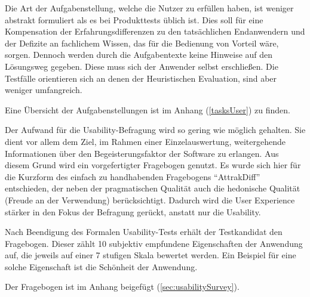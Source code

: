 Die Art der Aufgabenstellung, welche die Nutzer zu erfüllen haben, ist weniger abstrakt formuliert als es bei Produkttests üblich ist. Dies soll für eine Kompensation der Erfahrungsdifferenzen zu den tatsächlichen Endanwendern und der Defizite an fachlichem Wissen, das für die Bedienung von Vorteil wäre, sorgen. Dennoch werden durch die Aufgabentexte keine Hinweise auf den Lösungsweg gegeben. Diese muss sich der Anwender selbst erschließen. Die Testfälle orientieren sich an denen der Heuristischen Evaluation, sind aber weniger umfangreich.\par
Eine Übersicht der Aufgabenstellungen ist im Anhang (\ref{tasksUser}) zu finden.\par
{}
Der Aufwand für die Usability-Befragung wird so gering wie möglich gehalten. Sie dient vor allem dem Ziel, im Rahmen einer Einzelauswertung, weitergehende Informationen über den Begeisterungsfaktor der Software zu erlangen. Aus diesem Grund wird ein vorgefertigter Fragebogen genutzt. Es wurde sich hier für die Kurzform des einfach zu handhabenden Fragebogens \enquote{AttrakDiff} entschieden, der neben der pragmatischen Qualität auch die hedonische Qualität (Freude an der Verwendung) berücksichtigt. Dadurch wird die User Experience stärker in den Fokus der Befragung gerückt, anstatt nur die Usability.\cite[S. 237]{Ullenboom2014}\par
Nach Beendigung des Formalen Usability-Tests erhält der Testkandidat den Fragebogen. Dieser zählt 10 subjektiv empfundene Eigenschaften der Anwendung auf, die jeweils auf einer 7 stufigen Skala bewertet werden. Ein Beispiel für eine solche Eigenschaft ist die Schönheit der Anwendung.\par
Der Fragebogen ist im Anhang beigefügt (\ref{sec:usabilitySurvey}).\par
